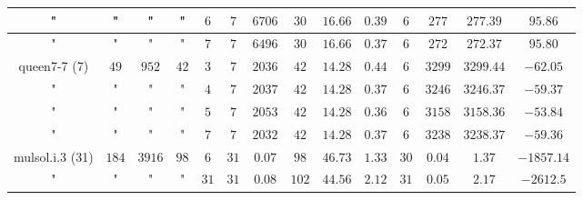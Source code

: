 \documentclass[12pt]{article}
\theoremstyle{slplain}
\begin{document}
\begin{table}[H]
\begin{center}
\begin{tabular}{|c|c|c|c|c|c|c|c|c|c|c|c|c|c|}
\hline
{\small "} & {\small "} & {\small "} & {\small "} & {\small $6$} & {\small $7$} & {\small $6706$} & {\small $30$}  & {\small $16.66$} & {\small $0.39$} & {\small $6$} & {\small $277$} & {\small $277.39$} & {\small $95.86$}\\
\hline
{\small "} & {\small "} & {\small "} & {\small "} & {\small $7$} & {\small $7$} & {\small $6496$} & {\small $30$}  & {\small $16.66$} & {\small $0.37$} & {\small $6$} & {\small $272$} & {\small $272.37$} & {\small $95.80$}\\
\hline
\hline
{\small queen7-7 (7)} & {\small $49$} & {\small $952$} & {\small $42$} & {\small $3$} & {\small $7$} & {\small $2036$} & {\small $42$} & {\small $14.28$} & {\small $0.44$} & {\small $6$} & {\small $3299$} & {\small $3299.44$} & {\small $-62.05$}\\
\hline
{\small "} & {\small "} & {\small "} & {\small "} & {\small $4$} & {\small $7$} & {\small $2037$} & {\small $42$}  & {\small $14.28$} & {\small $0.37$} & {\small $6$} & {\small $3246$} & {\small $3246.37$} & {\small $-59.37$}\\
\hline
{\small "} & {\small "} & {\small "} & {\small "} & {\small $5$} & {\small $7$} & {\small $2053$} & {\small $42$}  & {\small $14.28$} & {\small $0.36$} & {\small $6$} & {\small $3158$} & {\small $3158.36$} & {\small $-53.84$}\\
\hline
{\small "} & {\small "} & {\small "} & {\small "} & {\small $7$} & {\small $7$} & {\small $2032$} & {\small $42$} & {\small $14.28$} & {\small $0.37$} & {\small $6$} & {\small $3238$} & {\small $3238.37$} & {\small $-59.36$}\\
\hline
\hline
{\small mulsol.i.3 (31)} & {\small $184$} & {\small $3916$} & {\small $98$} & {\small $6$} & {\small $31$} & {\small $0.07$} & {\small $98$} & {\small $46.73$} & {\small $1.33$} & {\small $30$} & {\small $0.04$} & {\small $1.37$} & {\small $-1857.14$}\\
\hline
{\small "} & {\small "} & {\small "} & {\small "} & {\small $31$} & {\small $31$} & {\small $0.08$} & {\small $102$} & {\small $44.56$} & {\small $2.12$} & {\small $31$} & {\small $0.05$} & {\small $2.17$} & {\small $-2612.5$}\\
\hline
\end{tabular}
\end{center}

\end{table}
\end{document}
